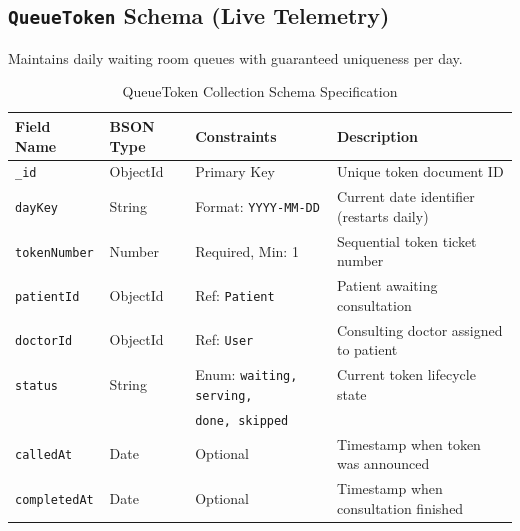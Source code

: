 \documentclass[12pt,a4paper,oneside]{report}
\begin{document}
\subsection{\texttt{QueueToken} Schema (Live Telemetry)}
Maintains daily waiting room queues with guaranteed uniqueness per day.
\begin{table}[h!]
\centering
\caption{QueueToken Collection Schema Specification}
\small
\begin{tabularx}{\textwidth}{l l l X}
\toprule
\textbf{Field Name} & \textbf{BSON Type} & \textbf{Constraints} & \textbf{Description} \\
\midrule
\texttt{\_id} & ObjectId & Primary Key & Unique token document ID \\
\texttt{dayKey} & String & Format: \texttt{YYYY-MM-DD} & Current date identifier (restarts daily) \\
\texttt{tokenNumber} & Number & Required, Min: 1 & Sequential token ticket number \\
\texttt{patientId} & ObjectId & Ref: \texttt{Patient} & Patient awaiting consultation \\
\texttt{doctorId} & ObjectId & Ref: \texttt{User} & Consulting doctor assigned to patient \\
\texttt{status} & String & Enum: \texttt{waiting, serving,} & Current token lifecycle state \\
& & \texttt{done, skipped} & \\
\texttt{calledAt} & Date & Optional & Timestamp when token was announced \\
\texttt{completedAt} & Date & Optional & Timestamp when consultation finished \\
\bottomrule
\end{tabularx}
\end{table}
\end{document}
